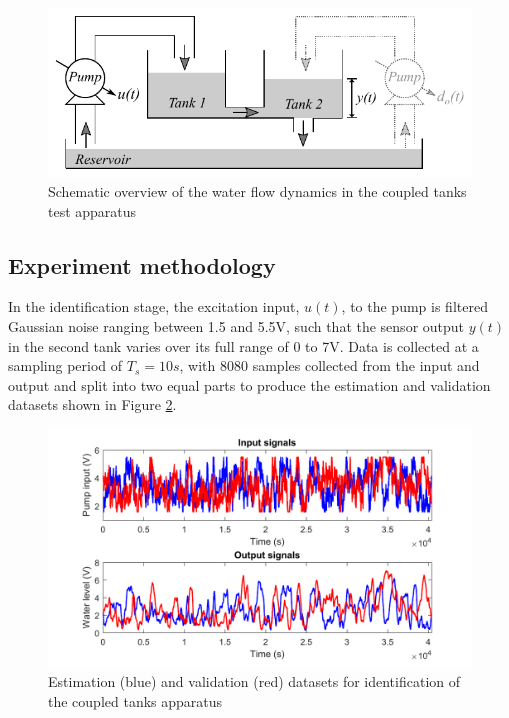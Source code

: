 \begin{figure}[h]
\centering
\includegraphics[width=1\textwidth]{Chapter11_ControlStudy/CoupledTanksSchematicDisturbance.pdf}
\caption{Schematic overview of the water flow dynamics in the coupled tanks test apparatus}
\label{fig:CoupledTanksSchematic}
\end{figure}

\subsection{Experiment methodology}

In the identification stage, the excitation input, $u(t)$, to the pump is filtered Gaussian noise ranging between 1.5 and 5.5V, such that the sensor output $y(t)$ in the second tank varies over its full range of 0 to 7V. Data is collected at a sampling period of $T_s = 10s$, with $8080$ samples collected from the input and output and split into two equal parts to produce the estimation and validation datasets shown in Figure \ref{fig:CoupledTanksData}. 

\begin{figure}[h]
\centering
\includegraphics[width=1\textwidth]{Chapter11_ControlStudy/CoupledTanksDatasets.pdf}
\caption{Estimation (blue) and validation (red) datasets for identification of the coupled tanks apparatus}
\label{fig:CoupledTanksData}
\end{figure}

